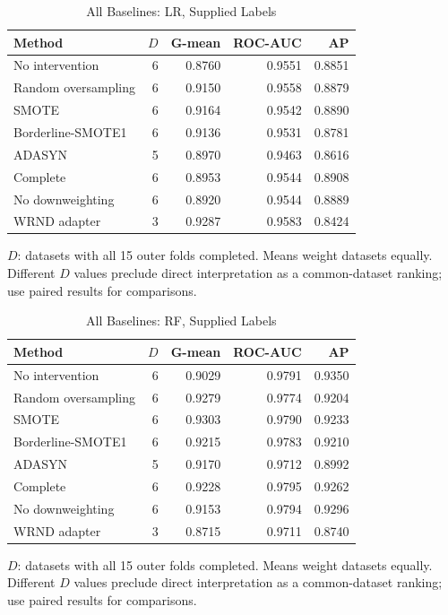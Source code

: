\begin{table}[t]
\caption{All Baselines: LR, Supplied Labels}
\label{tab:all_baselines_lr_0}
\centering\small
\begin{tabular}{lrrrr}
\hline
Method & $D$ & G-mean & ROC-AUC & AP\\
\hline
No intervention & 6 & 0.8760 & 0.9551 & 0.8851 \\
Random oversampling & 6 & 0.9150 & 0.9558 & 0.8879 \\
SMOTE & 6 & 0.9164 & 0.9542 & 0.8890 \\
Borderline-SMOTE1 & 6 & 0.9136 & 0.9531 & 0.8781 \\
ADASYN & 5 & 0.8970 & 0.9463 & 0.8616 \\
Complete & 6 & 0.8953 & 0.9544 & 0.8908 \\
No downweighting & 6 & 0.8920 & 0.9544 & 0.8889 \\
WRND adapter & 3 & 0.9287 & 0.9583 & 0.8424 \\
\hline
\end{tabular}
\par\smallskip\footnotesize $D$: datasets with all 15 outer folds completed. Means weight datasets equally. Different $D$ values preclude direct interpretation as a common-dataset ranking; use paired results for comparisons.
\end{table}

\begin{table}[t]
\caption{All Baselines: RF, Supplied Labels}
\label{tab:all_baselines_rf_0}
\centering\small
\begin{tabular}{lrrrr}
\hline
Method & $D$ & G-mean & ROC-AUC & AP\\
\hline
No intervention & 6 & 0.9029 & 0.9791 & 0.9350 \\
Random oversampling & 6 & 0.9279 & 0.9774 & 0.9204 \\
SMOTE & 6 & 0.9303 & 0.9790 & 0.9233 \\
Borderline-SMOTE1 & 6 & 0.9215 & 0.9783 & 0.9210 \\
ADASYN & 5 & 0.9170 & 0.9712 & 0.8992 \\
Complete & 6 & 0.9228 & 0.9795 & 0.9262 \\
No downweighting & 6 & 0.9153 & 0.9794 & 0.9296 \\
WRND adapter & 3 & 0.8715 & 0.9711 & 0.8740 \\
\hline
\end{tabular}
\par\smallskip\footnotesize $D$: datasets with all 15 outer folds completed. Means weight datasets equally. Different $D$ values preclude direct interpretation as a common-dataset ranking; use paired results for comparisons.
\end{table}

